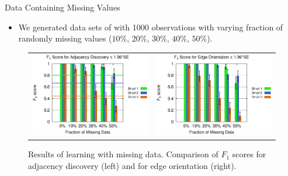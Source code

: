 \documentclass[hyperref={pdfpagelabels=false}]{beamer}
\begin{document}
\begin{frame}{Data Containing Missing Values}
	\begin{itemize}\small
		\item We generated data sets of with 1000 observations with varying fraction of randomly missing values ($10\%$, $20\%$, $30\%$, $40\%$, $50\%$). 
	\end{itemize}
		\begin{figure}[ht]
			\begin{center}
				\centering
				\begin{tabular}{>{\centering}m{2.0in} >{\centering\arraybackslash}m{2.0in}}
					\includegraphics[width=1.1\linewidth]{figures/F1A_single_missing.eps} &\includegraphics[width=1.1\linewidth]{figures/F1O_single_missing.eps}\\
				\end{tabular}
			\end{center}
			\caption{\footnotesize Results of learning with missing data. Comparison of $F_1$ scores for adjacency discovery (left) and for edge orientation (right). }
			\label{fig:f1-missing} 
		\end{figure}	
\end{frame}
\end{document}
